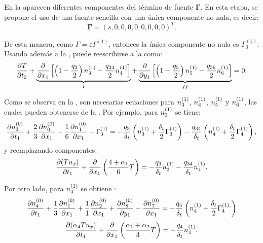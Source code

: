 En la  aparecen diferentes componentes del t\'ermino de fuente $\bm{\Gamma}$. En esta etapa, se propone el uso de una fuente sencilla con una \'unica componente no nula, es decir:
\begin{equation}
	\bm{\Gamma} = (s,0,0,0,0,0,0,0,0)^T.	
\end{equation}

De esta manera, como $\Gamma = \varepsilon \Gamma^{(1)}$, entonces la \'unica componente no nula es $\Gamma_0^{(1)}$. Usando adem\'as a la , puede reescribirse a la  como:
\begin{equation}
	\dfrac{\partial T}{\partial t_2} + 
	\underbrace{\dfrac{\partial}{\partial x_1}\left[ \left( 1-\dfrac{q_3}{2} \right) n_{3}^{(1)} - \dfrac{q_{34}}{2} n_{4}^{(1)} \right]}_{I} 	+  \underbrace{ \dfrac{\partial}{\partial y_1}\left[ \left( 1-\dfrac{q_5}{2} \right) n_{5}^{(1)} - \dfrac{q_{56}}{2}  n_{6}^{(1)} \right]}_{II} = 0	.
	\label{eq:eps_2_reduced}
\end{equation}

Como se observa en la , son necesarias ecuaciones para $n_{3}^{(1)}$, $n_{4}^{(1)}$, $n_{5}^{(1)}$ y $n_{6}^{(1)}$, las cuales pueden obtenerse de la . Por ejemplo, para $n_{3}^{(1)}$ se tiene:
\begin{equation}
	\dfrac{\partial n_{3}^{(0)}}{\partial t_1} + \dfrac{2}{3}\dfrac{\partial n_{0}^{(0)}}{\partial x_1} + \dfrac{1}{6}\dfrac{\partial n_{1}^{(0)}}{\partial x_1} - \Gamma_3^{(1)} = -\dfrac{q_3}{\delta_t} \left( n_{3}^{(1)} +\dfrac{\delta_t}{2} \Gamma_3^{(1)}\right) - \dfrac{q_{34}}{\delta_t} \left( n_{4}^{(1)} +\dfrac{\delta_t}{2} \Gamma_4^{(1)}\right),
\end{equation}
y reemplazando componentes:
\begin{equation}
	\dfrac{\partial (Tu_x)}{\partial t_1} + \dfrac{\partial}{\partial x_1} \left(\dfrac{4+\alpha_1}{6} T \right) = -\dfrac{q_3}{\delta_t} n_{3}^{(1)} - \dfrac{q_{34}}{\delta_t} n_{4}^{(1)}.
	\label{eq:n3_2d}
\end{equation}

Por otro lado, para $n_{4}^{(1)}$ se obtiene :
\begin{equation}
	\dfrac{\partial n_{4}^{(0)}}{\partial t_1} + \dfrac{1}{3}\dfrac{\partial n_{1}^{(0)}}{\partial x_1} + \dfrac{1}{1}\dfrac{\partial n_{2}^{(0)}}{\partial x_1}  + \dfrac{\partial n_{8}^{(0)}}{\partial y_1} - \dfrac{\partial n_{7}^{(0)}}{\partial x_1}	
	= -\dfrac{q_4}{\delta_t} \left( n_{4}^{(1)} +\dfrac{\delta_t}{2} \Gamma_4^{(1),}\right)
\end{equation}
\begin{equation}
	\dfrac{\partial (\alpha_4 Tu_x)}{\partial t_1} + \dfrac{\partial}{\partial x_1} \left(\dfrac{\alpha_1 + \alpha_2}{3} T \right) = -\dfrac{q_4}{\delta_t} n_{4}^{(1)}.
	\label{eq:n4_2d}
\end{equation}

